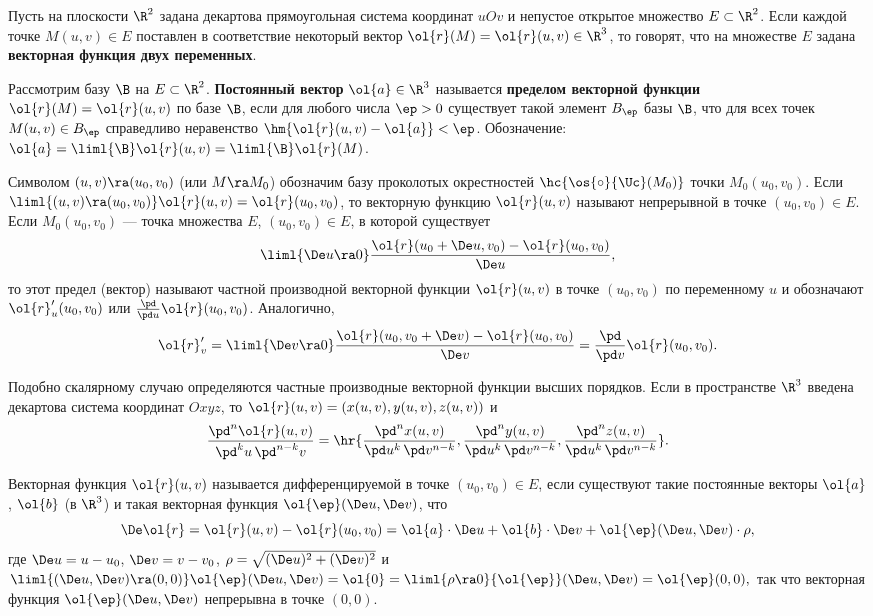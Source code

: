\documentclass[a4paper]{article}
\begin{document}
Пусть на плоскости $\R^2$ задана декартова прямоугольная система
координат $uOv$ и непустое открытое множество $E\subset \R^2$. Если
каждой точке $M(u,v)\in E$ поставлен в соответствие некоторый вектор
$\ol{r}(M)=\ol{r}(u,v)\in\R^3$, то говорят, что на множестве $E$
задана \textbf{векторная функция двух переменных}.

Рассмотрим базу $\B$ на $E\subset \R^2$. \textbf{Постоянный вектор}
$\ol{a}\in\R^3$ называется \textbf{пределом векторной функции}
$\ol{r}(M)=\ol{r}(u,v)$ по базе $\B$, если для любого числа $\ep>0$
существует такой элемент $B_{\ep}$ базы $\B$, что для всех точек
$M(u,v)\in B_{\ep}$ справедливо неравенство $\hm{\ol{r}(u,v) -
\ol{a}}<\ep$. Обозначение: $\ol{a} = \liml{\B} \ol{r}(u,v) =
\liml{\B} \ol{r}(M)$.

Символом $(u,v)\ra(u_0,v_0)$ (или $M\ra M_0$) обозначим базу
проколотых окрестностей $\hc{\os{\circ}{\Uc}(M_0)}$ точки
$M_0(u_0,v_0)$. Если $\liml{(u,v)\ra(u_0,v_0)} \ol{r}(u,v) =
\ol{r}(u_0,v_0)$, то векторную функцию $\ol{r}(u,v)$ называют
непрерывной в точке $(u_0,v_0)\in E$. Если $M_0(u_0,v_0)$ --- точка
множества $E$, $(u_0,v_0)\in E$, в которой существует $$\liml{\De
u\ra0} \frac{\ol{r}(u_0+\De u,v_0) - \ol{r}(u_0,v_0)}{\De u},$$ то
этот предел (вектор) называют частной производной векторной функции
$\ol{r}(u,v)$ в точке $(u_0,v_0)$ по переменному $u$ и обозначают
$\ol{r}'_u (u_0,v_0)$ или $\frac{\pd}{\pd u} \ol{r}(u_0,v_0)$.
Аналогично, $$\ol{r}'_v = \liml{\De v\ra0} \frac{\ol{r}(u_0,v_0+\De
v)-\ol{r}(u_0,v_0)}{\De v} = \frac{\pd}{\pd v} \ol{r}(u_0,v_0).$$

Подобно скалярному случаю определяются частные производные векторной
функции высших порядков. Если в пространстве $\R^3$ введена
декартова система координат $Oxyz$, то
$\ol{r}(u,v)=(x(u,v),y(u,v),z(u,v))$ и $$\frac{\pd^n
\ol{r}(u,v)}{\pd^k u \,\pd^{n-k} v} = \hr{\frac{\pd^n x(u,v)}{\pd
u^k\, \pd v^{n-k}}, \frac{\pd^n y(u,v)}{\pd u^k \,\pd v^{n-k}},
\frac{\pd^n z(u,v)}{\pd u^k \,\pd v^{n-k}}}.$$

Векторная функция $\ol{r}(u,v)$ называется дифференцируемой в точке
$(u_0,v_0)\in E$, если существуют такие постоянные векторы $\ol{a}$,
$\ol{b}$ (в $\R^3$) и такая векторная функция $\ol{\ep}(\De u,\De
v)$, что $$\De \ol{r} = \ol{r}(u,v) - \ol{r}(u_0,v_0) = \ol{a} \cdot
\De u + \ol{b} \cdot \De v + \ol{\ep}(\De u,\De v)\cdot\rho,$$ где
$\De u=u-u_0$, $\De v=v-v_0$, $\rho=\sqrt{(\De u)^2 + (\De v)^2}$ и
$\liml{(\De u,\De v)\ra(0,0)} \ol{\ep}(\De u,\De v)=\ol{0} =
\liml{\rho\ra0}{\ol{\ep}}(\De u,\De v) = \ol{\ep}(0,0),$ так что
векторная функция $\ol{\ep}(\De u,\De v)$ непрерывна в точке
$(0,0)$.
\end{document}
